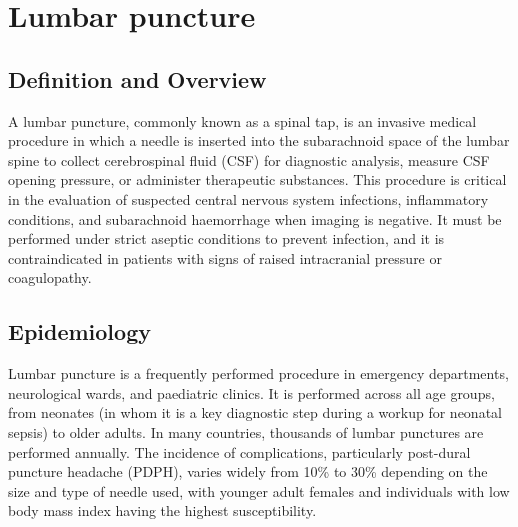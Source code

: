 \chapter{Lumbar puncture}

\section*{Definition and Overview}
A lumbar puncture, commonly known as a spinal tap, is an invasive medical procedure in which a needle is inserted into the subarachnoid space of the lumbar spine to collect cerebrospinal fluid (CSF) for diagnostic analysis, measure CSF opening pressure, or administer therapeutic substances. This procedure is critical in the evaluation of suspected central nervous system infections, inflammatory conditions, and subarachnoid haemorrhage when imaging is negative. It must be performed under strict aseptic conditions to prevent infection, and it is contraindicated in patients with signs of raised intracranial pressure or coagulopathy.

\section*{Epidemiology}
Lumbar puncture is a frequently performed procedure in emergency departments, neurological wards, and paediatric clinics. It is performed across all age groups, from neonates (in whom it is a key diagnostic step during a workup for neonatal sepsis) to older adults. In many countries, thousands of lumbar punctures are performed annually. The incidence of complications, particularly post-dural puncture headache (PDPH), varies widely from 10\% to 30\% depending on the size and type of needle used, with younger adult females and individuals with low body mass index having the highest susceptibility.

